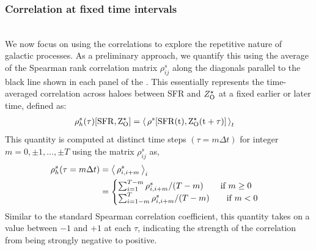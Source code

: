 \subsubsection{Correlation at fixed time intervals}
\label{sec:halhal-corr-sfrZ}
 \\
We now focus on using the correlations to explore the repetitive nature of galactic processes. As a preliminary approach, we quantify this using the average of the Spearman rank correlation matrix $\rho^s_{ij}$ along the diagonals parallel to the black line shown in each panel of the . This essentially represents the time-averaged correlation across haloes between SFR and $Z^{\star}_{\rm{O}}$ at a fixed earlier or later time, defined as:
\begin{align}
\rho^s_h(\tau)[\rm{SFR}, Z^{\star}_{\rm{O}}] &= \left\langle \, \rho^s [ \rm{SFR}(t), Z^{\star}_{\rm{O}}(t+\tau)] \, \right\rangle_{t}  
\end{align}
This quantity is computed at distinct time steps $(\tau=m \Delta t)$ for integer $m = 0,\pm 1,\ldots,\pm T$ using the matrix $\rho^s_{ij}$ as,
\begin{align}
\label{eq:def-hal-correl}
\rho^s_h(\tau = m \Delta t) 
&= \left\langle \, \rho^s_{i,i+m} \, \right\rangle_i \\
&= \begin{cases}
\sum_{i=1}^{T-m} \rho^s_{i,i+m}/(T-m) \qquad \text{if } m \geq 0 \\
\sum_{i=1-m}^{T} \rho^s_{i,i+m}/(T-m) \qquad \text{if } m < 0
\end{cases}
\end{align}
Similar to the standard Spearman correlation coefficient, this quantity takes on a value between $-1$ and $+1$ at each $\tau$, indicating the strength of the correlation from being strongly negative to positive.
